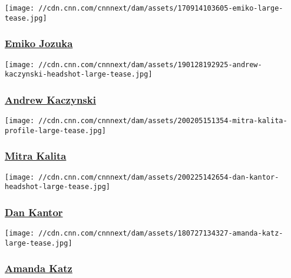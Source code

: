 \href{/profiles/emiko-jozuka}{}

\texttt{[image: //cdn.cnn.com/cnnnext/dam/assets/170914103605-emiko-large-tease.jpg]}

\hypertarget{emiko-jozuka}{%
\subsubsection{\texorpdfstring{\href{/profiles/emiko-jozuka}{Emiko
Jozuka}}{Emiko Jozuka}}\label{emiko-jozuka}}

\href{/profiles/andrew-kaczynski}{}

\texttt{[image: //cdn.cnn.com/cnnnext/dam/assets/190128192925-andrew-kaczynski-headshot-large-tease.jpg]}

\hypertarget{andrew-kaczynski}{%
\subsubsection{\texorpdfstring{\href{/profiles/andrew-kaczynski}{Andrew
Kaczynski}}{Andrew Kaczynski}}\label{andrew-kaczynski}}

\href{/profiles/mitra-kalita}{}

\texttt{[image: //cdn.cnn.com/cnnnext/dam/assets/200205151354-mitra-kalita-profile-large-tease.jpg]}

\hypertarget{mitra-kalita}{%
\subsubsection{\texorpdfstring{\href{/profiles/mitra-kalita}{Mitra
Kalita}}{Mitra Kalita}}\label{mitra-kalita}}

\href{/profiles/daniel-kantor}{}

\texttt{[image: //cdn.cnn.com/cnnnext/dam/assets/200225142654-dan-kantor-headshot-large-tease.jpg]}

\hypertarget{dan-kantor}{%
\subsubsection{\texorpdfstring{\href{/profiles/daniel-kantor}{Dan
Kantor}}{Dan Kantor}}\label{dan-kantor}}

\href{/profiles/amanda-katz}{}

\texttt{[image: //cdn.cnn.com/cnnnext/dam/assets/180727134327-amanda-katz-large-tease.jpg]}

\hypertarget{amanda-katz}{%
\subsubsection{\texorpdfstring{\href{/profiles/amanda-katz}{Amanda
Katz}}{Amanda Katz}}\label{amanda-katz}}

